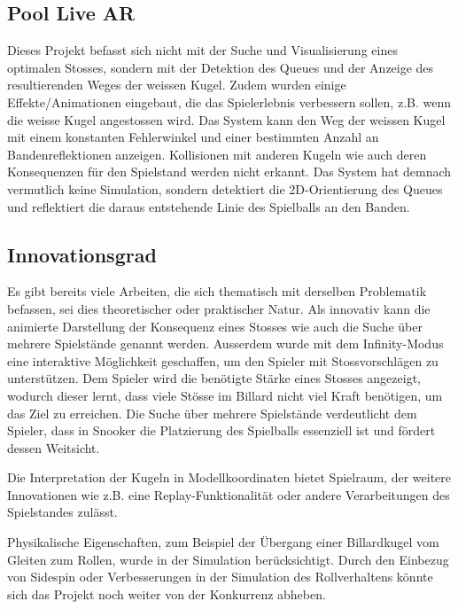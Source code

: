 \subsection{Pool Live AR}
Dieses Projekt befasst sich nicht mit der Suche und Visualisierung eines optimalen Stosses, sondern mit der
Detektion des Queues und der Anzeige des resultierenden Weges der weissen Kugel\cite{poollivear}. Zudem wurden einige
Effekte/Animationen eingebaut, die das Spielerlebnis verbessern sollen, z.B. wenn die weisse Kugel angestossen wird.
Das System kann den Weg der weissen Kugel mit einem konstanten Fehlerwinkel und einer bestimmten Anzahl an
Bandenreflektionen anzeigen.
Kollisionen mit anderen Kugeln wie auch deren Konsequenzen für den Spielstand werden nicht erkannt.
Das System hat demnach vermutlich keine Simulation, sondern detektiert die 2D-Orientierung des Queues und reflektiert die
daraus entstehende Linie des Spielballs an den Banden.

\subsection{Innovationsgrad}
Es gibt bereits viele Arbeiten, die sich thematisch mit derselben Problematik befassen, sei dies theoretischer oder
praktischer Natur.
Als innovativ kann die animierte Darstellung der Konsequenz eines Stosses wie auch die Suche über
mehrere Spielstände genannt werden.
Ausserdem wurde mit dem Infinity-Modus eine interaktive Möglichkeit geschaffen, um den Spieler mit Stossvorschlägen zu unterstützen.
Dem Spieler wird die benötigte Stärke eines Stosses angezeigt, wodurch dieser lernt, dass viele Stösse im Billard nicht viel
Kraft benötigen, um das Ziel zu erreichen.
Die Suche über mehrere Spielstände verdeutlicht dem Spieler, dass in Snooker die Platzierung des Spielballs essenziell ist
und fördert dessen Weitsicht.

Die Interpretation der Kugeln in Modellkoordinaten bietet Spielraum,
der weitere Innovationen wie z.B. eine Replay-Funktionalität oder andere Verarbeitungen des Spielstandes zulässt.

Physikalische Eigenschaften, zum Beispiel der Übergang einer Billardkugel vom Gleiten zum Rollen,
wurde in der Simulation berücksichtigt.
Durch den Einbezug von Sidespin oder Verbesserungen in der Simulation des Rollverhaltens könnte sich das
Projekt noch weiter von der Konkurrenz abheben.
